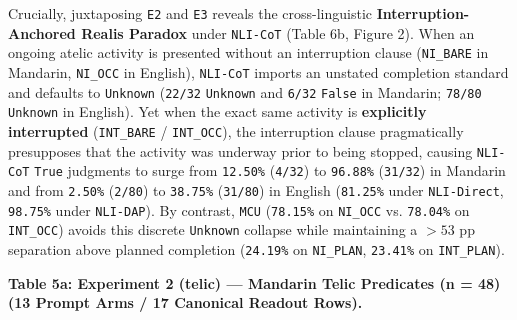 \documentclass[11pt,a4paper]{article}
\begin{document}
Crucially, juxtaposing \texttt{E2} and \texttt{E3} reveals the cross-linguistic \textbf{Interruption-Anchored Realis Paradox} under \texttt{NLI-\allowbreak{}CoT} (Table 6b, Figure 2). When an ongoing atelic activity is presented without an interruption clause (\texttt{NI\_\allowbreak{}BARE} in Mandarin, \texttt{NI\_\allowbreak{}OCC} in English), \texttt{NLI-\allowbreak{}CoT} imports an unstated completion standard and defaults to \texttt{Unknown} (\texttt{22/\allowbreak{}32} \texttt{Unknown} and \texttt{6/\allowbreak{}32} \texttt{False} in Mandarin; \texttt{78/\allowbreak{}80} \texttt{Unknown} in English). Yet when the exact same activity is \textbf{explicitly interrupted} (\texttt{INT\_\allowbreak{}BARE} / \texttt{INT\_\allowbreak{}OCC}), the interruption clause pragmatically presupposes that the activity was underway prior to being stopped, causing \texttt{NLI-\allowbreak{}CoT} \texttt{True} judgments to surge from \texttt{12.50\%} (\texttt{4/\allowbreak{}32}) to \texttt{96.88\%} (\texttt{31/\allowbreak{}32}) in Mandarin and from \texttt{2.50\%} (\texttt{2/\allowbreak{}80}) to \texttt{38.75\%} (\texttt{31/\allowbreak{}80}) in English (\texttt{81.25\%} under \texttt{NLI-\allowbreak{}Direct}, \texttt{98.75\%} under \texttt{NLI-\allowbreak{}DAP}). By contrast, \texttt{MCU} (\texttt{78.15\%} on \texttt{NI\_\allowbreak{}OCC} vs. \texttt{78.04\%} on \texttt{INT\_\allowbreak{}OCC}) avoids this discrete \texttt{Unknown} collapse while maintaining a $>53\text{ pp}$ separation above planned completion (\texttt{24.19\%} on \texttt{NI\_\allowbreak{}PLAN}, \texttt{23.41\%} on \texttt{INT\_\allowbreak{}PLAN}).


\textbf{Table 5a: Experiment 2 (telic) --- Mandarin Telic Predicates (n = 48) (13 Prompt Arms / 17 Canonical Readout Rows).}
\end{document}

